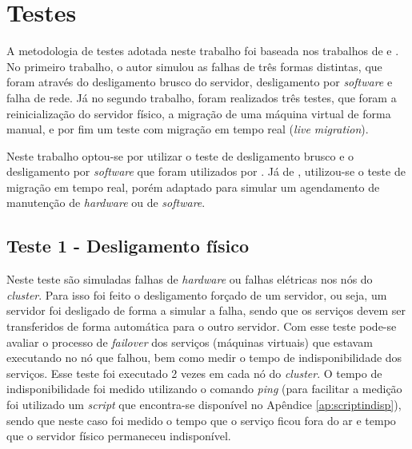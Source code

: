\section{Testes}

A metodologia de testes adotada neste trabalho foi baseada nos trabalhos de \citet{reis2009} e \citet{goncalves2009}. No primeiro trabalho, 
o autor simulou as falhas de três formas distintas, que foram através do desligamento brusco do servidor, desligamento por \textit{software} e 
falha de rede. Já no segundo trabalho, foram realizados três testes, que foram a reinicialização do servidor físico, a migração de uma 
máquina virtual de forma manual, e por fim um teste com migração em tempo real (\textit{live migration}).

Neste trabalho optou-se por utilizar o teste de desligamento brusco e o desligamento por \textit{software} que foram utilizados por 
\citet{reis2009}. Já de \citet{goncalves2009}, utilizou-se o teste de migração em tempo real, porém adaptado para simular um agendamento de 
manutenção de \textit{hardware} ou de \textit{software}.


\subsection{Teste 1 - Desligamento físico}

Neste teste são simuladas falhas de \textit{hardware} ou falhas elétricas nos nós do \textit{cluster}. Para isso foi feito o desligamento 
forçado de um servidor, ou seja, um servidor foi desligado de forma a simular a falha, sendo que os serviços devem ser transferidos de forma
automática para o outro servidor. Com esse teste pode-se avaliar o processo de \textit{failover} dos serviços (máquinas virtuais) que estavam 
executando no nó que falhou, bem como medir o tempo de indisponibilidade dos serviços. Esse teste foi executado 2 vezes em cada nó do 
\textit{cluster}. O tempo de indisponibilidade foi medido utilizando o comando \textit{ping} (para facilitar a medição foi utilizado um 
\textit{script} que encontra-se disponível no Apêndice \ref{ap:scriptindisp}), sendo que neste caso foi medido o tempo que o serviço ficou
fora do ar e tempo que o servidor físico permaneceu indisponível.

